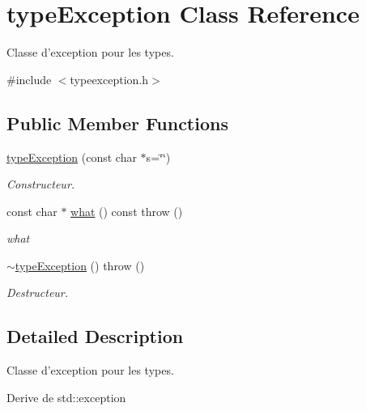 \hypertarget{classtype_exception}{\section{type\-Exception Class Reference}
\label{classtype_exception}
}


Classe d'exception pour les types.  




{\ttfamily \#include $<$typeexception.\-h$>$}

\subsection*{Public Member Functions}
\begin{DoxyCompactItemize}
\item 
\hyperlink{classtype_exception_a929459bb1b2c25570a7a8db39dc780c9}{type\-Exception} (const char $\ast$s=\char`\"{}\char`\"{})
\begin{DoxyCompactList}\small\item\em Constructeur. \end{DoxyCompactList}\item 
const char $\ast$ \hyperlink{classtype_exception_acb09e914ab67041e5aedd399b78241a7}{what} () const   throw ()
\begin{DoxyCompactList}\small\item\em what \end{DoxyCompactList}\item 
\hypertarget{classtype_exception_a9eae7b8d8c538fa64ae5f40a23ae417e}{\hyperlink{classtype_exception_a9eae7b8d8c538fa64ae5f40a23ae417e}{$\sim$type\-Exception} ()  throw ()}\label{classtype_exception_a9eae7b8d8c538fa64ae5f40a23ae417e}

\begin{DoxyCompactList}\small\item\em Destructeur. \end{DoxyCompactList}\end{DoxyCompactItemize}


\subsection{Detailed Description}
Classe d'exception pour les types. 

Derive de std\-::exception 

